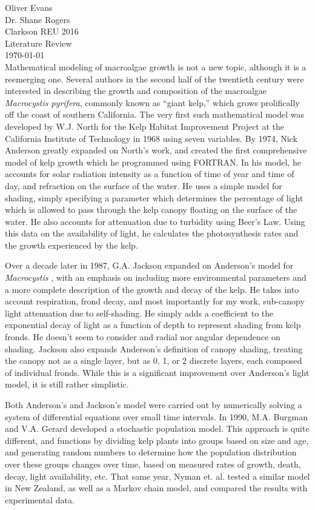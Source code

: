 \documentclass[10pt]{article}
\begin{document}
\noindent
Oliver Evans \\
Dr. Shane Rogers \\
Clarkson REU 2016 \\
Literature Review \\
\today \\

Mathematical modeling of macroalgae growth is not a new topic, although it is a reemerging one.
Several authors in the second half of the twentieth century were interested in describing the growth and composition of the macroalgae \textit{Macrocystis pyrifera}, commonly known as ``giant kelp,'' which grows prolifically off the coast of southern California.
The very first such mathematical model was developed by W.J. North for the Kelp Habitat Improvement Project at the California Institute of Technology in 1968 using seven variables.
By 1974, Nick Anderson greatly expanded on North's work, and created the first comprehensive model of kelp growth which he programmed using FORTRAN.
\autocite{anderson_mathematical_1974}
In his model, he accounts for solar radiation intensity as a function of time of year and time of day, and refraction on the surface of the water.
He uses a simple model for shading, simply specifying a parameter which determines the percentage of light which is allowed to pass through the kelp canopy floating on the surface of the water.
He also accounts for attenuation due to turbidity using Beer's Law.
Using this data on the availability of light, he calculates the photosynthesis rates and the growth experienced by the kelp.

Over a decade later in 1987, G.A.
Jackson\autocite{jackson_modelling_1987} expanded on Anderson's model for \textit{Macrocystis} , with an emphasis on including more environmental parameters and a more complete description of the growth and decay of the kelp.
He takes into account respiration, frond decay, and most importantly for my work, sub-canopy light attenuation due to self-shading.
He simply adds a coefficient to the exponential decay of light as a function of depth to represent shading from kelp fronds.
He doesn't seem to consider and radial nor angular dependence on shading.
Jackson also expands Anderson's definition of canopy shading, treating the canopy not as a single layer, but as 0, 1, or 2 discrete layers, each composed of individual fronds.
While this is a significant improvement over Anderson's light model, it is still rather simplistic.

Both Anderson's and Jackson's model were carried out by numerically solving a system of differential equations over small time intervals.
In 1990, M.A. Burgman and V.A. Gerard developed a stochastic population model. \autocite{burgman_stage-structured_1990}
This approach is quite different, and functions by dividing kelp plants into groups based on size and age, and generating random numbers to determine how the population distribution over these groups changes over time, based on measured rates of growth, death, decay, light availability, etc.
That same year, Nyman et. al. tested a similar model in New Zealand, as well as a Markov chain model, and compared the results with experimental data.
\end{document}
